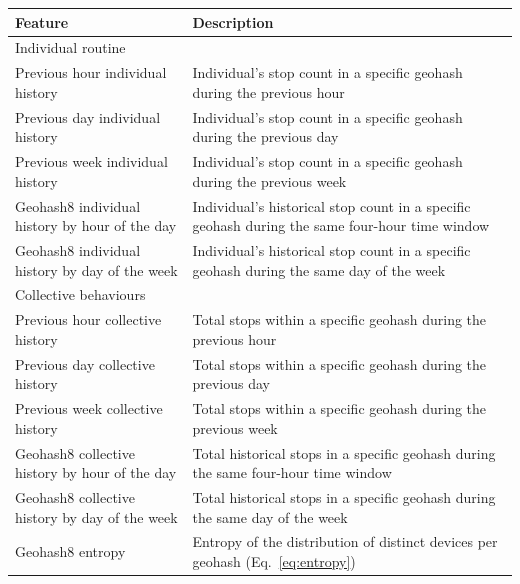 \documentclass{article}
\begin{document}
\begin{table}[b!]
	\centering
 \begin{scriptsize}
	\begin{tabular}{ll}
		\toprule
		\textbf{Feature}     & \textbf{Description}   \\
		\midrule
            Individual routine & \\ 
		\hspace{4mm} Previous hour individual history &  Individual's stop count in a specific geohash during the previous hour \\
		\hspace{4mm} Previous day individual history     & Individual's stop count in a specific geohash during the previous day  \\
		\hspace{4mm} Previous week individual history     & Individual's stop count in a specific geohash during the previous week  \\
		\hspace{4mm} Geohash8 individual history by hour of the day   & Individual's historical stop count in a specific geohash during the same four-hour time window \\
		\hspace{4mm} Geohash8 individual history by day of the week    & Individual's historical stop count in a specific geohash during the same day of the week  \\\midrule
  
            Collective behaviours & \\
		\hspace{4mm} Previous hour collective history & Total stops within a specific geohash during the previous hour \\
		\hspace{4mm} Previous day collective history     & Total stops within a specific geohash during the previous day  \\
		\hspace{4mm} Previous week collective history     & Total stops within a specific geohash during the previous week  \\
		\hspace{4mm} Geohash8 collective history by hour of the day   & Total historical stops in a specific geohash during the same four-hour time window  \\
		\hspace{4mm} Geohash8 collective history by day of the week     & Total historical stops in a specific geohash during the same day of the week  \\
		\hspace{4mm} Geohash8 entropy     & Entropy of the distribution of distinct devices per geohash (Eq.~\ref{eq:entropy})\\\midrule


\end{tabular}
\end{scriptsize}
\end{table}
\end{document}
